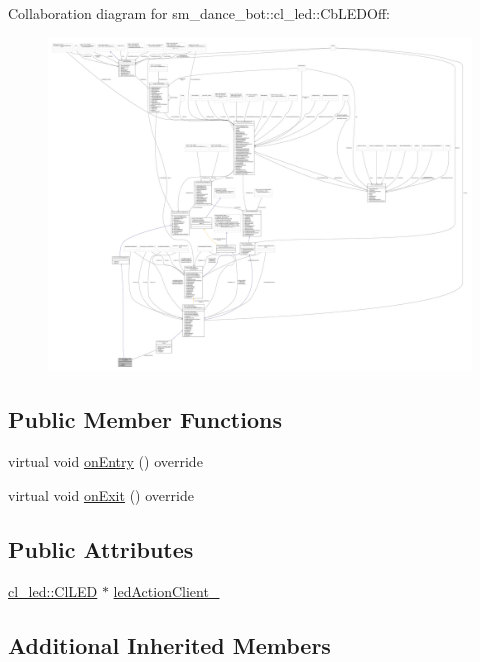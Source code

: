 Collaboration diagram for sm\+\_\+dance\+\_\+bot\+:\+:cl\+\_\+led\+:\+:Cb\+L\+E\+D\+Off\+:
\nopagebreak
\begin{figure}[H]
\begin{center}
\leavevmode
\includegraphics[width=350pt]{classsm__dance__bot_1_1cl__led_1_1CbLEDOff__coll__graph}
\end{center}
\end{figure}
\subsection*{Public Member Functions}
\begin{DoxyCompactItemize}
\item 
virtual void \hyperlink{classsm__dance__bot_1_1cl__led_1_1CbLEDOff_a3c0ed097db52baae1928a19936f09a83}{on\+Entry} () override
\item 
virtual void \hyperlink{classsm__dance__bot_1_1cl__led_1_1CbLEDOff_ad0db28985308dd486943d1f511c655ad}{on\+Exit} () override
\end{DoxyCompactItemize}
\subsection*{Public Attributes}
\begin{DoxyCompactItemize}
\item 
\hyperlink{classsm__dance__bot_1_1cl__led_1_1ClLED}{cl\+\_\+led\+::\+Cl\+L\+ED} $\ast$ \hyperlink{classsm__dance__bot_1_1cl__led_1_1CbLEDOff_a338a86c573b1b9c9cc4af9459145d68e}{led\+Action\+Client\+\_\+}
\end{DoxyCompactItemize}
\subsection*{Additional Inherited Members}


